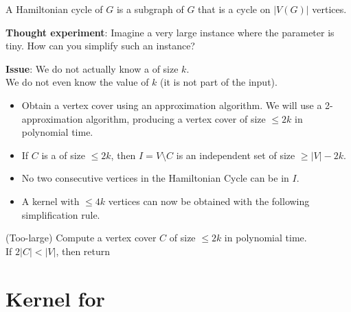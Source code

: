 \begin{frame}[allowframebreaks]
	\slides{\frametitle{\HC}}

	\noindent
	A \alert{Hamiltonian cycle} of $G$ is a subgraph of $G$ that is a cycle on $|V(G)|$ vertices.


	\noindent
	\textbf{Thought experiment}: Imagine a very large instance where the parameter is tiny. How can you simplify such an instance?

	\framebreak
	\noindent
	\textbf{Issue}: We do not actually know a \vc of size $k$.\\We do not even know the value of $k$ (it is not part of the input).

	\framebreak

	\begin{itemize}
		\item Obtain a vertex cover using an approximation algorithm. We will use a 2-approximation algorithm, producing a vertex cover of size $\le 2k$ in polynomial time.
		\item If $C$ is a \vc of size $\le 2k$, then $I = V\setminus C$ is an independent set of size $\ge |V|-2k$.
		\item No two consecutive vertices in the Hamiltonian Cycle can be in $I$.
		\item A kernel with $\le 4k$ vertices can now be obtained with the following simplification rule.
	\end{itemize}

	\begin{block}{(Too-large)}
		Compute a vertex cover $C$ of size $\le 2k$ in polynomial time.\\
		If $2|C|<|V|$, then return \No
	\end{block}

\end{frame}


\section{Kernel for \ECC}

